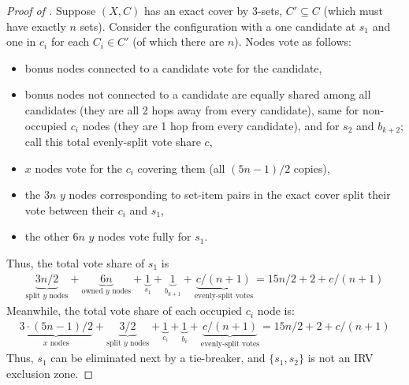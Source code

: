 \documentclass{article}
\theoremstyle{theorem}
\theoremstyle{definition}
\begin{document}
\begin{proof}[Proof of ]
  Suppose $(X, C)$ has an exact cover by 3-sets, $C'\subseteq C$ (which must have exactly $n$ sets). Consider the configuration with a one candidate at $s_1$ and one in $c_i$ for each $C_i \in C'$ (of which there are $n$). Nodes vote as follows:
  \begin{itemize}
    \item bonus nodes connected to a candidate vote for the candidate,
    \item bonus nodes not connected to a candidate are equally shared among all candidates (they are all 2 hops away from every candidate), same for non-occupied $c_i$ nodes (they are 1 hop from every candidate), and for $s_2$ and $b_{k+2}$; call this total evenly-split vote share $c$,
    \item $x$ nodes vote for the $c_i$ covering them (all $(5n-1)/2$ copies),
    \item the $3n$ $y$ nodes corresponding to set-item pairs in the exact cover split their vote between their $c_i$ and $s_1$,
    \item the other $6n$ $y$ nodes vote fully for $s_1$.
  \end{itemize}
  Thus, the total vote share of $s_1$ is
  \begin{align*}
    \underbrace{3n/2}_{\text{split $y$ nodes}} + \underbrace{6n}_{\text{owned $y$ nodes}} + \underbrace{1}_{s_1} + \underbrace{1}_{b_{k+1}} + \underbrace{c/(n+1)}_{\text{evenly-split votes}} = 15n/2 + 2 + c/(n+1)
  \end{align*}
  Meanwhile, the total vote share of each occupied $c_i$ node is:
  \begin{align*}
    \underbrace{3 \cdot (5n-1)/2}_{\text{$x$ nodes}} +\underbrace{3/2}_{\text{split $y$ nodes}} + \underbrace{1}_{c_i} + \underbrace{1}_{b_i} + \underbrace{c/(n+1)}_{\text{evenly-split votes}} = 15n/2 + 2 + c/(n+1)
  \end{align*}
  Thus, $s_1$ can be eliminated next by a tie-breaker, and $\{s_1, s_2\}$ is not an IRV exclusion zone.
  

\end{proof}
\end{document}
